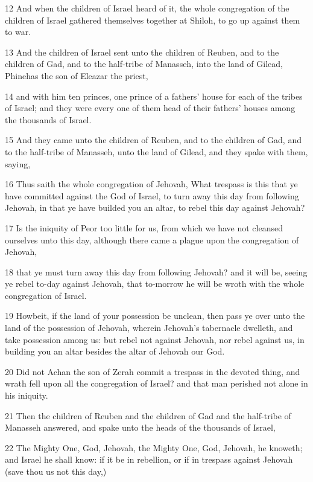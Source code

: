 \par 12 And when the children of Israel heard of it, the whole congregation of the children of Israel gathered themselves together at Shiloh, to go up against them to war.
\par 13 And the children of Israel sent unto the children of Reuben, and to the children of Gad, and to the half-tribe of Manasseh, into the land of Gilead, Phinehas the son of Eleazar the priest,
\par 14 and with him ten princes, one prince of a fathers' house for each of the tribes of Israel; and they were every one of them head of their fathers' houses among the thousands of Israel.
\par 15 And they came unto the children of Reuben, and to the children of Gad, and to the half-tribe of Manasseh, unto the land of Gilead, and they spake with them, saying,
\par 16 Thus saith the whole congregation of Jehovah, What trespass is this that ye have committed against the God of Israel, to turn away this day from following Jehovah, in that ye have builded you an altar, to rebel this day against Jehovah?
\par 17 Is the iniquity of Peor too little for us, from which we have not cleansed ourselves unto this day, although there came a plague upon the congregation of Jehovah,
\par 18 that ye must turn away this day from following Jehovah? and it will be, seeing ye rebel to-day against Jehovah, that to-morrow he will be wroth with the whole congregation of Israel.
\par 19 Howbeit, if the land of your possession be unclean, then pass ye over unto the land of the possession of Jehovah, wherein Jehovah's tabernacle dwelleth, and take possession among us: but rebel not against Jehovah, nor rebel against us, in building you an altar besides the altar of Jehovah our God.
\par 20 Did not Achan the son of Zerah commit a trespass in the devoted thing, and wrath fell upon all the congregation of Israel? and that man perished not alone in his iniquity.
\par 21 Then the children of Reuben and the children of Gad and the half-tribe of Manasseh answered, and spake unto the heads of the thousands of Israel,
\par 22 The Mighty One, God, Jehovah, the Mighty One, God, Jehovah, he knoweth; and Israel he shall know: if it be in rebellion, or if in trespass against Jehovah (save thou us not this day,)
